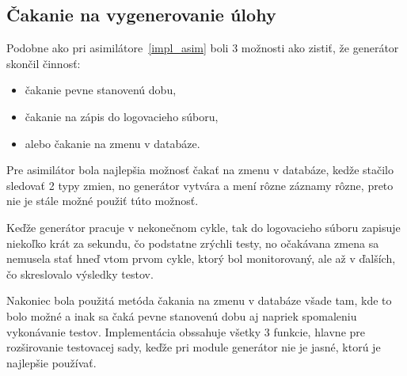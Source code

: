 \subsection*{Čakanie na vygenerovanie úlohy}
Podobne ako pri asimilátore~\ref{impl_asim} boli 3 možnosti ako zistiť, že generátor skončil činnosť:
\begin{itemize}
	\item čakanie pevne stanovenú dobu,
	\item čakanie na zápis do logovacieho súboru, 
	\item alebo čakanie na zmenu v databáze.
\end{itemize}
Pre asimilátor bola najlepšia možnosť čakať na zmenu v databáze, kedže stačilo sledovať 2 typy zmien, no generátor vytvára a mení rôzne záznamy rôzne, preto nie je stále možné použiť túto možnosť.

Keďže generátor pracuje v nekonečnom cykle, tak do logovacieho súboru zapisuje niekoľko krát za sekundu, čo podstatne zrýchli testy, no očakávana zmena sa nemusela stať hneď vtom prvom cykle, ktorý bol monitorovaný, ale až v ďalších, čo skreslovalo výsledky testov.

Nakoniec bola použitá metóda čakania na zmenu v databáze všade tam, kde to bolo možné a inak sa čaká pevne stanovenú dobu aj napriek spomaleniu vykonávanie testov.
Implementácia obssahuje všetky 3 funkcie, hlavne pre rozširovanie testovacej sady, keďže pri module generátor nie je jasné, ktorú je najlepšie používať.

